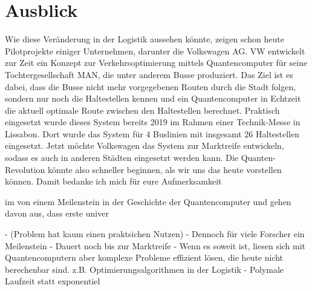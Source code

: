 \chapter{Ausblick}
\label{ch:ausblick}
Wie diese Veränderung in der Logistik aussehen könnte, zeigen schon heute Pilotprojekte einiger Unternehmen, darunter die Volkswagen AG. VW entwickelt zur Zeit ein Konzept zur Verkehrsoptimierung mittels Quantencomputer für seine Tochtergesellschaft MAN, die unter anderem Busse produziert. Das Ziel ist es dabei, dass die Busse nicht mehr vorgegebenen Routen durch die Stadt folgen, sondern nur noch die Haltestellen kennen und ein Quantencomputer in Echtzeit die aktuell optimale Route zwischen den Haltestellen berechnet. Praktisch eingesetzt wurde dieses System bereits 2019 im Rahmen einer Technik-Messe in Lissabon. Dort wurde das System für 4 Buslinien mit insgesamt 26 Haltestellen eingesetzt. Jetzt möchte Volkswagen das System zur Marktreife entwickeln, sodass es auch in anderen Städten eingesetzt werden kann.
Die Quanten-Revolution könnte also schneller beginnen, als wir uns das heute vorstellen können.
Damit bedanke ich mich für eure Aufmerksamkeit


im von einem Meilenstein in der Geschichte der Quantencomputer und gehen davon aus, dass erste univer

- (Problem hat kaum einen praktsichen Nutzen)
- Dennoch für viele Forscher ein Meilenstein
- Dauert noch bis zur Marktreife
- Wenn es soweit ist, liesen sich mit Quantencomputern aber komplexe Probleme effizient lösen, die heute nicht berechenbar sind. z.B. Optimierungsalgorithmen in der Logistik 
- Polymale Laufzeit statt exponentiel


